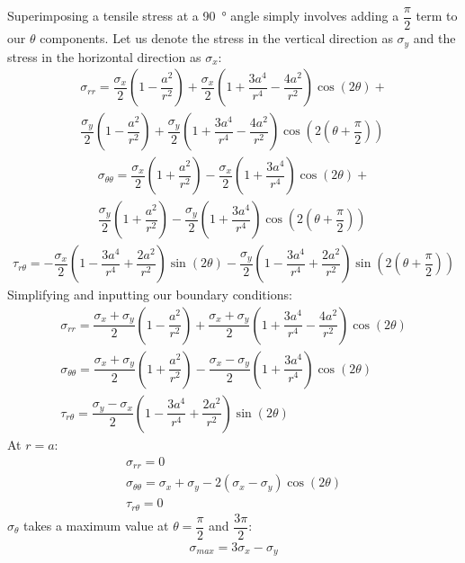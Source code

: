 \documentclass[11pt]{article}
\numberwithin{equation}{section}
\begin{document}
Superimposing a tensile stress at a \SI{90}{\degree} angle simply involves adding a $\dfrac{\pi}{2}$ term to our $\theta$ components. Let us denote the stress in the vertical direction as $\sigma_y$ and the stress in the horizontal direction as $\sigma_x$:
\begin{multline}
    \sigma_{rr} = \dfrac{\sigma_x}{2}\left(1 - \dfrac{a^2}{r^2}\right) + \dfrac{\sigma_x}{2}\left(1+\dfrac{3a^4}{r^4}-\dfrac{4a^2}{r^2}\right)\cos\left(2\theta\right) + \\\dfrac{\sigma_y}{2}\left(1 - \dfrac{a^2}{r^2}\right) + \dfrac{\sigma_y}{2}\left(1+\dfrac{3a^4}{r^4}-\dfrac{4a^2}{r^2}\right)\cos\left(2\left(\theta + \dfrac{\pi}{2}\right)\right)
\end{multline}
\begin{multline}
    \sigma_{\theta\theta} = \dfrac{\sigma_x}{2}\left(1 + \dfrac{a^2}{r^2}\right) - \dfrac{\sigma_x}{2}\left(1 + \dfrac{3a^4}{r^4}\right)\cos \left(2\theta\right) + \\ \dfrac{\sigma_y}{2}\left(1 + \dfrac{a^2}{r^2}\right) - \dfrac{\sigma_y}{2}\left(1 + \dfrac{3a^4}{r^4}\right)\cos \left(2\left(\theta + \dfrac{\pi}{2}\right)\right)
\end{multline}
\begin{gather}
    \tau_{r\theta} = -\dfrac{\sigma_x}{2}\left(1 - \dfrac{3a^4}{r^4}+\dfrac{2a^2}{r^2}\right)\sin\left(2\theta\right) -\dfrac{\sigma_y}{2}\left(1 - \dfrac{3a^4}{r^4}+\dfrac{2a^2}{r^2}\right)\sin\left(2\left(\theta + \dfrac{\pi}{2}\right)\right)
\end{gather}
Simplifying and inputting our boundary conditions:
\begin{gather}
    \sigma_{rr} = \dfrac{\sigma_x + \sigma_y}{2}\left(1 - \dfrac{a^2}{r^2}\right) + \dfrac{\sigma_x + \sigma_y}{2}\left(1 + \dfrac{3a^4}{r^4}- \dfrac{4a^2}{r^2}\right)\cos \left(2\theta\right)\\
    \sigma_{\theta\theta} = \dfrac{\sigma_x + \sigma_y}{2}\left(1 + \dfrac{a^2}{r^2}\right) - \dfrac{\sigma_x - \sigma_y}{2}\left(1 + \dfrac{3a^4}{r^4}\right)\cos\left(2\theta\right)\\
    \tau_{r\theta} = \dfrac{\sigma_y - \sigma_x}{2}\left(1 -\dfrac{3a^4}{r^4}+ \dfrac{2a^2}{r^2}\right)\sin\left(2\theta\right)
\end{gather}
At $r =a$:
\begin{gather}
    \sigma_{rr} = 0\\
    \sigma_{\theta\theta} = \sigma_x + \sigma_y - 2\left(\sigma_x - \sigma_y\right)\cos\left(2\theta\right)\\
    \tau_{r\theta} = 0
\end{gather}
$\sigma_{\theta}$ takes a maximum value at $\theta = \dfrac{\pi}{2}$ and $\dfrac{3\pi}{2}$:
\begin{gather}
    \sigma_{max} = 3\sigma_x - \sigma_y\label{sigmaMax}
\end{gather}
\end{document}
